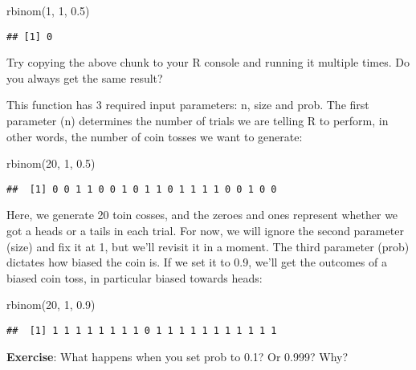 \documentclass[
]{book}
\newenvironment{Shaded}{\begin{snugshade}}{\end{snugshade}}
\newcommand{\DecValTok}[1]{\textcolor[rgb]{0.00,0.00,0.81}{#1}}
\newcommand{\FloatTok}[1]{\textcolor[rgb]{0.00,0.00,0.81}{#1}}
\newcommand{\FunctionTok}[1]{\textcolor[rgb]{0.00,0.00,0.00}{#1}}
\newcommand{\NormalTok}[1]{#1}
\begin{document}
\begin{Shaded}
\begin{Highlighting}[]
\FunctionTok{rbinom}\NormalTok{(}\DecValTok{1}\NormalTok{, }\DecValTok{1}\NormalTok{, }\FloatTok{0.5}\NormalTok{)}
\end{Highlighting}
\end{Shaded}

\begin{verbatim}
## [1] 0
\end{verbatim}

Try copying the above chunk to your R console and running it multiple times. Do you always get the same result?

This function has 3 required input parameters: n, size and prob. The first parameter (n) determines the number of trials we are telling R to perform, in other words, the number of coin tosses we want to generate:

\begin{Shaded}
\begin{Highlighting}[]
\FunctionTok{rbinom}\NormalTok{(}\DecValTok{20}\NormalTok{, }\DecValTok{1}\NormalTok{, }\FloatTok{0.5}\NormalTok{)}
\end{Highlighting}
\end{Shaded}

\begin{verbatim}
##  [1] 0 0 1 1 0 0 1 0 1 1 0 1 1 1 1 0 0 1 0 0
\end{verbatim}

Here, we generate 20 toin cosses, and the zeroes and ones represent whether we got a heads or a tails in each trial. For now, we will ignore the second parameter (size) and fix it at 1, but we'll revisit it in a moment. The third parameter (prob) dictates how biased the coin is. If we set it to 0.9, we'll get the outcomes of a biased coin toss, in particular biased towards heads:

\begin{Shaded}
\begin{Highlighting}[]
\FunctionTok{rbinom}\NormalTok{(}\DecValTok{20}\NormalTok{, }\DecValTok{1}\NormalTok{, }\FloatTok{0.9}\NormalTok{)}
\end{Highlighting}
\end{Shaded}

\begin{verbatim}
##  [1] 1 1 1 1 1 1 1 1 0 1 1 1 1 1 1 1 1 1 1 1
\end{verbatim}

\textbf{Exercise}: What happens when you set prob to 0.1? Or 0.999? Why?
\end{document}
